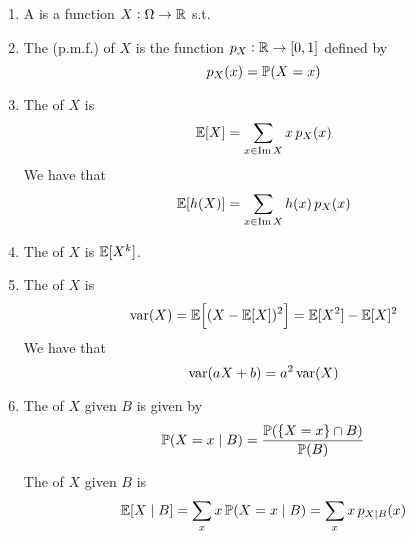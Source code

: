 \documentclass{styles/note}
\begin{document}
  \begin{enumerate}[label=(\alph*)]
    \item A  is a function $X : \Omega \to \mathbb{R}$ s.t.
    
    \item The  (p.m.f.) of $X$ is the function $p_X : \mathbb{R} \to [0, 1]$ defined by
      \[ p_X(x) = \operatorname{\mathbb{P}}(X = x) \]
    
    \item The  of $X$ is
      \begin{equation}
        \operatorname{\mathbb{E}}[X] = \sum_{x \in \operatorname{Im} X} x\, p_X(x)
      \end{equation}
      We have that
      \begin{equation}
        \operatorname{\mathbb{E}}[h(X)] = \sum_{x \in \operatorname{Im} X} h(x)\, p_X(x)
      \end{equation}
    
    \item The  of $X$ is $\operatorname{\mathbb{E}}[X^k]$.
    
    \item The  of $X$ is
      \begin{equation}
        \variance(X) = \expectation\left[(X - \expectation[X])^2\right] = \expectation[X^2] - \expectation[X]^2
      \end{equation}
      We have that
      \begin{equation}
        \operatorname{var}(aX + b) = a^2 \operatorname{var}(X)
      \end{equation}
    
    \item The  of $X$ given $B$ is given by
      \begin{equation}
        \operatorname{\mathbb{P}}(X = x \mid B) = \frac{\operatorname{\mathbb{P}}(\set{X = x} \cap B)}{\operatorname{\mathbb{P}}(B)}
      \end{equation}
      
      The  of $X$ given $B$ is
      \begin{equation}
        \operatorname{\mathbb{E}}[X \mid B] = \sum_x x \operatorname{\mathbb{P}}(X = x \mid B) = \sum_x x\, p_{X \mid B}(x)
      \end{equation}
    

\end{enumerate}
\end{document}
